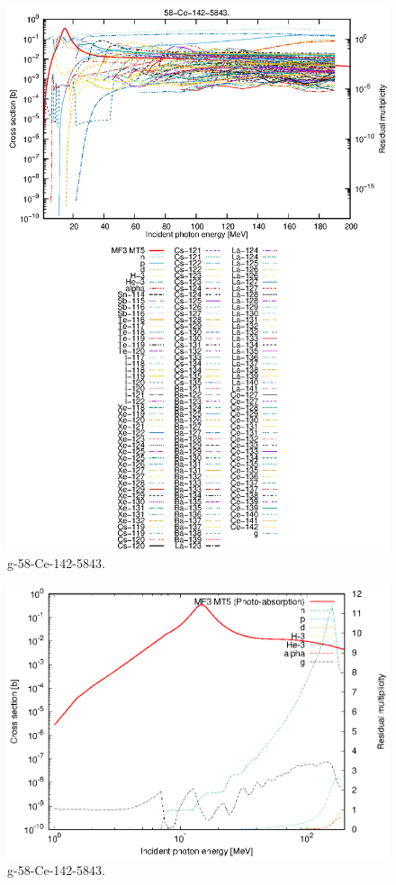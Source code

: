 \begin{figure}
 \includegraphics[width=\linewidth]{eps/g_58-Ce-142_5843.eps}
  \caption{g-58-Ce-142-5843.}
\end{figure}
\newpage \clearpage

\begin{figure}
 \includegraphics[width=\linewidth]{eps-log/g_58-Ce-142_5843.eps}
 \caption{g-58-Ce-142-5843.}
\end{figure}
\newpage \clearpage

